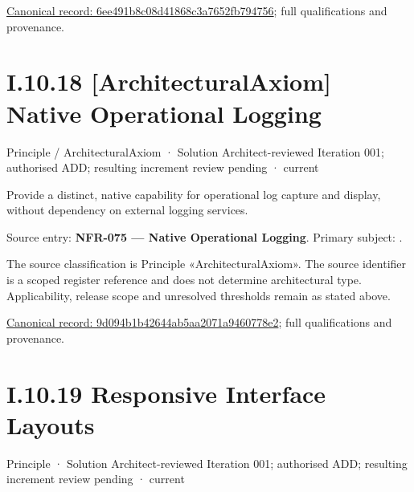 {\footnotesize \href{../../../../../../../continuum/motivation/principle/architectural-axiom/6ee491b8c08d41868c3a7652fb794756.md}{Canonical record: 6ee491b8c08d41868c3a7652fb794756}; full qualifications and provenance.}\par
\section*{I.10.18 [ArchitecturalAxiom] Native Operational Logging}
\label{navigation:I.10.18}

\label{element:9d094b1b42644ab5aa2071a9460778e2}
{\small Principle / ArchitecturalAxiom · Solution Architect-reviewed Iteration 001; authorised ADD; resulting increment review pending · current}\par

Provide a distinct, native capability for operational log capture and display, without dependency on external logging services.



Source entry: \textbf{NFR-075 — Native Operational Logging}. Primary subject: \texttt{}.



The source classification is Principle «ArchitecturalAxiom». The source identifier is a scoped register reference and does not determine architectural type. Applicability, release scope and unresolved thresholds remain as stated above.


{\footnotesize \href{../../../../../../../continuum/motivation/principle/architectural-axiom/9d094b1b42644ab5aa2071a9460778e2.md}{Canonical record: 9d094b1b42644ab5aa2071a9460778e2}; full qualifications and provenance.}\par
\section*{I.10.19 Responsive Interface Layouts}
\label{navigation:I.10.19}

\label{element:2e276eda09a94670bee0619468947895}
{\small Principle · Solution Architect-reviewed Iteration 001; authorised ADD; resulting increment review pending · current}\par

